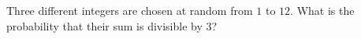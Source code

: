 Three different integers are chosen at random from $1$ to $12$. What is the probability that their sum is divisible by $3$?
